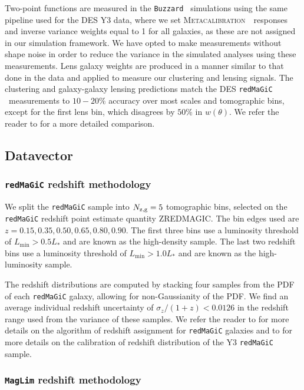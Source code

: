\documentclass[aps, prd,twocolumn,superscriptaddress,nofootinbib,preprintnumbers]{revtex4-1}
\newcommand{\wtheta}{\ensuremath{w(\theta)}}
\newcommand{\redmagic}{\texttt{redMaGiC} }
\newcommand{\maglim}{\texttt{MagLim} }
\newcommand{\buzzard}{\texttt{Buzzard} }
\newcommand{\metacal}{{\textsc{Metacalibration}~}}
\begin{document}
Two-point functions are measured in the \buzzard\ simulations using the same pipeline used for the DES Y3 data, where we set \metacal\ responses and inverse variance weights equal to 1 for all galaxies, as these are not assigned in our simulation framework. We have opted to make measurements without shape noise in order to reduce the variance in the simulated analyses using these measurements. Lens galaxy weights are produced in a manner similar to that done in the data and applied to measure our clustering and lensing signals. The clustering and galaxy-galaxy lensing predictions match the DES \redmagic\ measurements to $10-20\%$ accuracy over most scales and tomographic bins, except for the first lens bin, which disagrees by $50\%$ in \wtheta. We refer the reader to \citet*{y3-simvalidation} for a more detailed comparison.

\subsection{Datavector}

\subsubsection{\redmagic redshift methodology}
\label{sec:lensz}
We split the \redmagic sample into $N_{\rm z,g} = 5$ tomographic bins, selected on the \redmagic redshift point estimate quantity ZREDMAGIC. The bin edges used are $z=0.15, 0.35, 0.50, 0.65, 0.80, 0.90$. The first three bins use a luminosity threshold of $L_{\min} > 0.5 L_{*}$ and are known as the high-density sample. The last two redshift bins use a luminosity threshold of $L_{\min} > 1.0 L_{*}$ and are known as the high-luminosity sample.

The redshift distributions are computed by stacking four samples from the PDF of each \redmagic galaxy, allowing for non-Gaussianity of the PDF. We find an average individual redshift uncertainty of $\sigma_z/(1+z) < 0.0126$ in the redshift range used from the variance of these samples. We refer the reader to \citealp{Rozo_2016} for more details on the algorithm of redshift assignment for \redmagic galaxies and to \citealp{y3-lenswz} for more details on the calibration of redshift distribution of the Y3 \redmagic sample.  

\subsubsection{\maglim redshift methodology}
\end{document}
